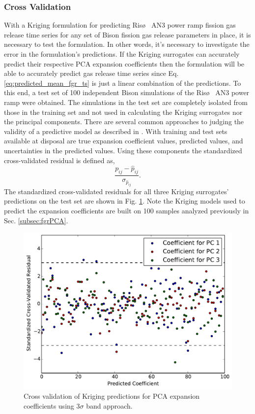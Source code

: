 \subsubsection{Cross Validation}
\label{subsec:cross_validation}

With a Kriging formulation for predicting Ris\o~ AN3 power ramp fission gas release time series for any set of Bison fission gas release parameters in place, it is necessary to test the formulation. In other words, it's necessary to investigate the error in the formulation's predictions. If the Kriging surrogates can accurately predict their respective \ac{PCA} expansion coefficients then the formulation will be able to accurately predict gas release time series since Eq. \ref{eq:predicted_mean_fgr_ts} is just a linear combination of the predictions. To this end, a test set of 100 independent Bison simulations of the Ris\o~ AN3 power ramp were obtained. The simulations in the test set are completely isolated from those in the training set and not used in calculating the Kriging surrogates nor the principal components. There are several common approaches to judging the validity of a predictive model as described in \cite{Jones_Schonlau}. With training and test sets available at disposal are true expansion coefficient values, predicted values, and uncertainties in the predicted values. Using these components the standardized cross-validated residual is defined as,
\begin{equation}
\label{eq:stnd_xval_residual}
 \frac{ p_{ij} - \hat{p}_{ij} }{ \sigma_{\hat{p}_{ij}} } . 
\end{equation}  
The standardized cross-validated residuals for all three Kriging surrogates' predictions on the test set are shown in Fig. \ref{fig:xval_3sig_bands}. Note the Kriging models used to predict the expansion coefficients are built on 100 samples analyzed previously in Sec. \ref{subsec:fgrPCA}.  
\begin{figure}
\caption{\label{fig:xval_3sig_bands}
Cross validation of Kriging predictions for \ac{PCA} expansion coefficients using 3$\sigma$ band approach.}
 \begin{center}
  \includegraphics[scale=.75]{./Chapter4/xval_3sig_band.pdf}
 \end{center}
\end{figure}
